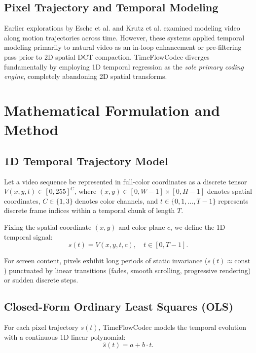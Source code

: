 \documentclass[conference]{IEEEtran}
\begin{document}
\subsection{Pixel Trajectory and Temporal Modeling}
Earlier explorations by Esche et al. \cite{esche2010novel} and Krutz et al. \cite{krutz2013adaptive} examined modeling video along motion trajectories across time. However, these systems applied temporal modeling primarily to natural video as an in-loop enhancement or pre-filtering pass prior to 2D spatial DCT compaction. TimeFlowCodec diverges fundamentally by employing 1D temporal regression as the \textit{sole primary coding engine}, completely abandoning 2D spatial transforms.

\section{Mathematical Formulation and Method}

\subsection{1D Temporal Trajectory Model}
Let a video sequence be represented in full-color coordinates as a discrete tensor $V(x, y, t) \in [0, 255]^C$, where $(x, y) \in [0, W-1] \times [0, H-1]$ denotes spatial coordinates, $C \in \{1, 3\}$ denotes color channels, and $t \in \{0, 1, \dots, T-1\}$ represents discrete frame indices within a temporal chunk of length $T$.

Fixing the spatial coordinate $(x, y)$ and color plane $c$, we define the 1D temporal signal:
\begin{equation}
    s(t) = V(x, y, t, c), \quad t \in [0, T-1].
\end{equation}

For screen content, pixels exhibit long periods of static invariance ($s(t) \approx \text{const}$) punctuated by linear transitions (fades, smooth scrolling, progressive rendering) or sudden discrete steps.

\subsection{Closed-Form Ordinary Least Squares (OLS)}
For each pixel trajectory $s(t)$, TimeFlowCodec models the temporal evolution with a continuous 1D linear polynomial:
\begin{equation}
    \hat{s}(t) = a + b \cdot t.
\end{equation}
\end{document}
